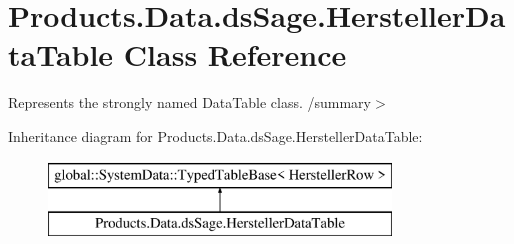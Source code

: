 \hypertarget{class_products_1_1_data_1_1ds_sage_1_1_hersteller_data_table}{}\section{Products.\+Data.\+ds\+Sage.\+Hersteller\+Data\+Table Class Reference}
\label{class_products_1_1_data_1_1ds_sage_1_1_hersteller_data_table}


Represents the strongly named Data\+Table class. /summary$>$  


Inheritance diagram for Products.\+Data.\+ds\+Sage.\+Hersteller\+Data\+Table\+:\begin{figure}[H]
\begin{center}
\leavevmode
\includegraphics[height=2.000000cm]{class_products_1_1_data_1_1ds_sage_1_1_hersteller_data_table}
\end{center}
\end{figure}
